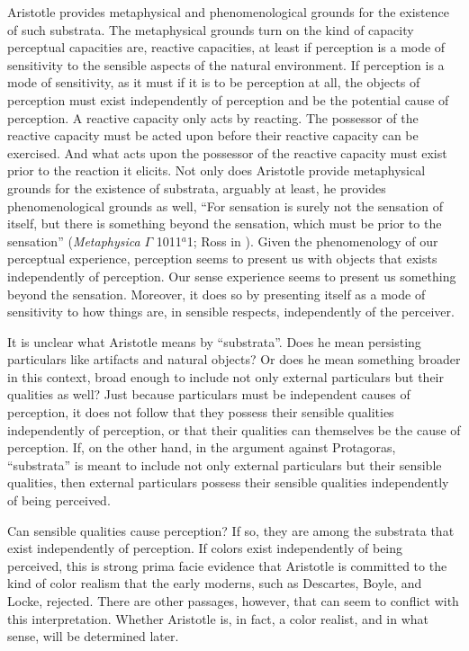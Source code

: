 Aristotle provides metaphysical and phenomenological grounds for the existence of such substrata. The metaphysical grounds turn on the kind of capacity perceptual capacities are, reactive capacities, at least if perception is a mode of sensitivity to the sensible aspects of the natural environment. If perception is a mode of sensitivity, as it must if it is to be perception at all, the objects of perception must exist independently of perception and be the potential cause of perception. A reactive capacity only acts by reacting. The possessor of the reactive capacity must be acted upon before their reactive capacity can be exercised. And what acts upon the possessor of the reactive capacity must exist prior to the reaction it elicits. Not only does Aristotle provide metaphysical grounds for the existence of substrata, arguably at least, he provides phenomenological grounds as well, ``For sensation is surely not the sensation of itself, but there is something beyond the sensation, which must be prior to the sensation'' (\emph{Metaphysica} \( \Gamma \) 1011\( ^{a} \)1; Ross in \citealt[56]{Barnes:1984kx}). Given the phenomenology of our perceptual experience, perception seems to present us with objects that exists independently of perception. Our sense experience seems to present us something beyond the sensation. Moreover, it does so by presenting itself as a mode of sensitivity to how things are, in sensible respects, independently of the perceiver.

It is unclear what Aristotle means by ``substrata''. Does he mean persisting particulars like artifacts and natural objects? Or does he mean something broader in this context, broad enough to include not only external particulars but their qualities as well? Just because particulars must be independent causes of perception, it does not follow that they possess their sensible qualities independently of perception, or that their qualities can themselves be the cause of perception. If, on the other hand, in the argument against Protagoras, ``substrata'' is meant to include not only external particulars but their sensible qualities, then external particulars possess their sensible qualities independently of being perceived. 

Can sensible qualities cause perception? If so, they are among the substrata that exist independently of perception. If colors exist independently of being perceived, this is strong prima facie evidence that Aristotle is committed to the kind of color realism that the early moderns, such as Descartes, Boyle, and Locke, rejected. There are other passages, however, that can seem to conflict with this interpretation. Whether Aristotle is, in fact, a color realist, and in what sense, will be determined later.

